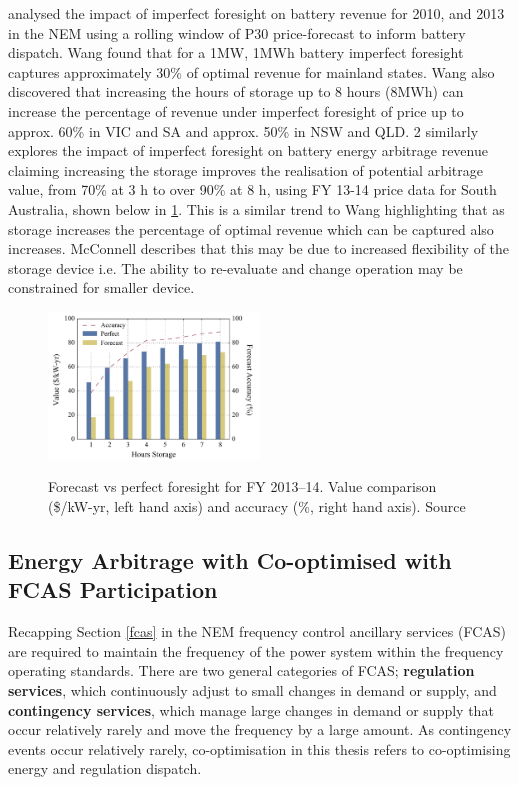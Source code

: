 \parencite{Wang} analysed the impact of imperfect foresight on battery revenue for 2010, and 2013 in the NEM using a rolling window of P30 price-forecast to inform battery dispatch. Wang found that for a 1MW, 1MWh battery imperfect foresight captures approximately 30\% of optimal revenue for mainland states. Wang also discovered that increasing the hours of storage up to 8 hours (8MWh) can increase the percentage of revenue under imperfect foresight of price up to approx. 60\% in VIC and SA and approx. 50\% in NSW and QLD.
2
\parencite{McConnell} similarly explores the impact of imperfect foresight on battery energy arbitrage revenue claiming increasing the storage improves the realisation of potential arbitrage value, from 70\% at 3 h to over 90\% at 8 h, using FY 13-14 price data for South Australia, shown below in \ref{fig:mcconnel_2014}. This is a similar trend to Wang highlighting that as storage increases the percentage of optimal revenue which can be captured also increases. McConnell describes that this may be due to increased flexibility of the storage device i.e. The ability to re-evaluate and change operation may be constrained for smaller device. 
\begin{figure}[H]
    \centering
    \includegraphics[width=0.5\textwidth]{Pictures/Chapter2/mcconnel.png}\
    \caption{Forecast vs perfect foresight for FY 2013–14. Value comparison (\$/kW-yr,
left hand axis) and accuracy (\%, right hand axis). Source \parencite{McConnell}}
    \label{fig:mcconnel_2014}
\end{figure}
\subsection{ Energy Arbitrage with Co-optimised with FCAS Participation }
\label{cooptimisation}
Recapping Section \ref{fcas} in the NEM frequency control ancillary services (FCAS) are required to maintain the frequency of the power system within the frequency operating standards. There are two general categories of FCAS; \textbf{regulation services}, which continuously adjust to small changes in demand or supply, and \textbf{contingency services}, which manage large changes in demand or supply that occur relatively rarely and move the frequency by a large amount.
As contingency events occur relatively rarely, co-optimisation in this thesis refers to co-optimising energy and regulation dispatch.


